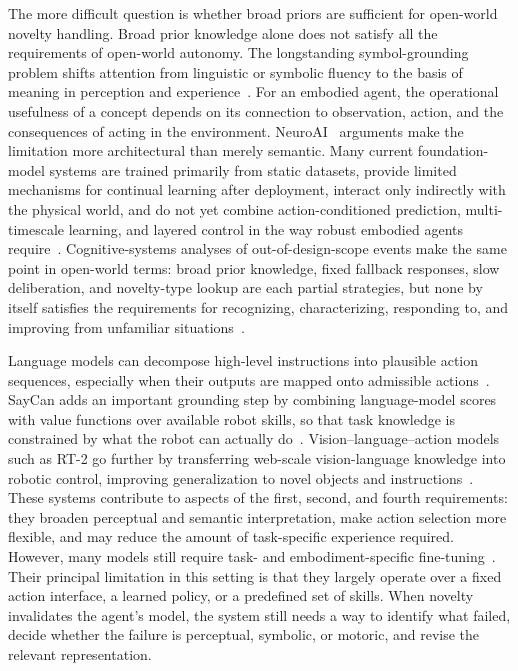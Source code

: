 The more difficult question is whether broad priors are sufficient for open-world novelty handling.
Broad prior knowledge alone does not satisfy all the requirements of open-world autonomy.
The longstanding symbol-grounding problem shifts attention from linguistic or symbolic fluency to the basis of meaning in perception and experience~\citep{harnad1990symbol,bisk2020experience}.
For an embodied agent, the operational usefulness of a concept depends on its connection to observation, action, and the consequences of acting in the environment.
NeuroAI~\citep{zador2025neuroai} arguments make the limitation more architectural than merely semantic.
Many current foundation-model systems are trained primarily from static datasets, provide limited mechanisms for continual learning after deployment, interact only indirectly with the physical world, and do not yet combine action-conditioned prediction, multi-timescale learning, and layered control in the way robust embodied agents require~\citep{zador2025neuroai}.
Cognitive-systems analyses of out-of-design-scope events make the same point in open-world terms: broad prior knowledge, fixed fallback responses, slow deliberation, and novelty-type lookup are each partial strategies, but none by itself satisfies the requirements for recognizing, characterizing, responding to, and improving from unfamiliar situations~\citep{wray2025requirements}.

Language models can decompose high-level instructions into plausible action sequences, especially when their outputs are mapped onto admissible actions~\citep{huang2022language}.
SayCan adds an important grounding step by combining language-model scores with value functions over available robot skills, so that task knowledge is constrained by what the robot can actually do~\citep{ahn2022can}.
Vision--language--action models such as RT-2 go further by transferring web-scale vision-language knowledge into robotic control, improving generalization to novel objects and instructions~\citep{pmlr-v229-zitkovich23a}.
These systems contribute to aspects of the first, second, and fourth requirements: they broaden perceptual and semantic interpretation, make action selection more flexible, and may reduce the amount of task-specific experience required.
However, many models still require task- and embodiment-specific fine-tuning~\citep{ma2026survey}.
Their principal limitation in this setting is that they largely operate over a fixed action interface, a learned policy, or a predefined set of skills.
When novelty invalidates the agent's model, the system still needs a way to identify what failed, decide whether the failure is perceptual, symbolic, or motoric, and revise the relevant representation.

